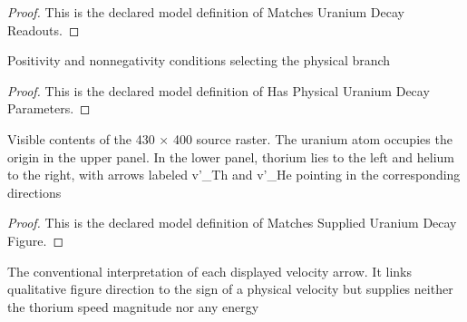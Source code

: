 \begin{proof}
  This is the declared model definition of Matches Uranium Decay Readouts.
\end{proof}
\begin{definition}
  \label{def:physics:phyx-mini-0551:phyxminiproblems-problemphyxmini0551-hasphysicaluraniumdecayparameters}
  Positivity and nonnegativity conditions selecting the physical branch
\end{definition}
\begin{proof}
  This is the declared model definition of Has Physical Uranium Decay Parameters.
\end{proof}
\begin{definition}
  \label{def:physics:phyx-mini-0551:phyxminiproblems-problemphyxmini0551-matchessupplieduraniumdecayfigure}
  Visible contents of the 430 × 400 source raster. The uranium atom occupies the origin in the upper panel. In the lower panel, thorium lies to the left and helium to the right, with arrows labeled v'\_Th and v'\_He pointing in the corresponding directions
\end{definition}
\begin{proof}
  This is the declared model definition of Matches Supplied Uranium Decay Figure.
\end{proof}
\begin{definition}
  \label{def:physics:phyx-mini-0551:phyxminiproblems-problemphyxmini0551-satisfiesfigurevelocitydirectionconvention}
  The conventional interpretation of each displayed velocity arrow. It links qualitative figure direction to the sign of a physical velocity but supplies neither the thorium speed magnitude nor any energy
\end{definition}
